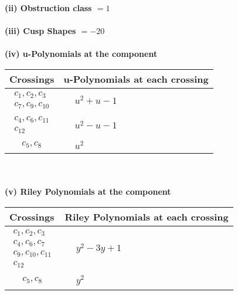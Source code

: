\documentclass[1p]{elsarticle_modified}
\theoremstyle{definition}
\begin{document}
\flushleft \textbf{(ii) Obstruction class $= 1$}\\~\\
\flushleft \textbf{(iii) Cusp Shapes $= -20$}\\~\\
\newpage\renewcommand{\arraystretch}{1}
\flushleft \textbf{(iv) u-Polynomials at the component}\newline \\
\begin{tabular}{m{50pt}|m{274pt}}
Crossings & \hspace{64pt}u-Polynomials at each crossing \\
\hline $$\begin{aligned}c_{1},c_{2},c_{3}\\c_{7},c_{9},c_{10}\end{aligned}$$&$\begin{aligned}
&u^2+u-1
\end{aligned}$\\
\hline $$\begin{aligned}c_{4},c_{6},c_{11}\\c_{12}\end{aligned}$$&$\begin{aligned}
&u^2- u-1
\end{aligned}$\\
\hline $$\begin{aligned}c_{5},c_{8}\end{aligned}$$&$\begin{aligned}
&u^2
\end{aligned}$\\
\hline
\end{tabular}\\~\\
\newpage\renewcommand{\arraystretch}{1}
\flushleft \textbf{(v) Riley Polynomials at the component}\newline \\
\begin{tabular}{m{50pt}|m{274pt}}
Crossings & \hspace{64pt}Riley Polynomials at each crossing \\
\hline $$\begin{aligned}c_{1},c_{2},c_{3}\\c_{4},c_{6},c_{7}\\c_{9},c_{10},c_{11}\\c_{12}\end{aligned}$$&$\begin{aligned}
&y^2-3 y+1
\end{aligned}$\\
\hline $$\begin{aligned}c_{5},c_{8}\end{aligned}$$&$\begin{aligned}
&y^2
\end{aligned}$\\
\hline
\end{tabular}\\~\\
\end{document}
